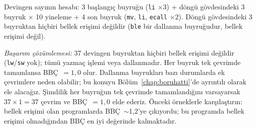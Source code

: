 \begin{ornek}[4.5]
Devingen sayının hesabı: 3 başlangıç buyruğu (\texttt{li} $\times 3$) + döngü gövdesindeki 3 buyruk $\times$ 10 yineleme + 4 son buyruk (\texttt{mv}, \texttt{li}, \texttt{ecall} $\times 2$). Döngü gövdesindeki 3 buyruktan hiçbiri bellek erişimi değildir (\texttt{ble} bir dallanma buyruğudur, bellek erişimi değil).

\emph{Başarım çözümlemesi:} 37 devingen buyruktan hiçbiri bellek erişimi değildir (\texttt{lw}/\texttt{sw} yok); tümü yazmaç işlemi veya dallanmadır. Her buyruk tek çevrimde tamamlansa BBÇ~$= 1{,}0$ olur. Dallanma buyrukları bazı durumlarda ek çevrimlere neden olabilir; bu konuyu Bölüm~\ref{chap:boruhatti}'de ayrıntılı olarak ele alacağız. Şimdilik her buyruğun tek çevrimde tamamlandığını varsayarsak $37 \times 1 = 37$ çevrim ve BBÇ~$= 1{,}0$ elde ederiz. Önceki örneklerle karşılaştırın: bellek erişimi olan programlarda BBÇ~$\sim$1{,}2'ye çıkıyordu; bu programda bellek erişimi olmadığından BBÇ en iyi değerinde kalmaktadır.
\end{ornek}

